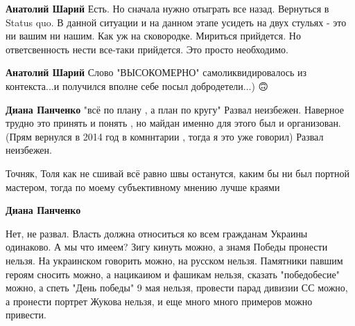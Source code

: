 \begin{itemize}
\begin{itemize}
\textbf{Анатолий Шарий} Есть. Но сначала нужно отыграть все назад. Вернуться в Status quo. В данной ситуации и на данном этапе усидеть на двух стульях - это ни вашим ни нашим. Как уж на сковородке. Мириться прийдется. Но ответсвенность нести все-таки прийдется. Это просто необходимо.

 
\textbf{Анатолий Шарий} Слово "ВЫСОКОМЕРНО" самоликвидировалось из контекста...\Laughey[1.0][white] и получился вполне себе посыл добродетели...) 🙃

 
\textbf{Диана Панченко}
"всё по плану , а план по кругу"
Развал неизбежен.
Наверное трудно это принять и понять , но майдан именно для этого был и организован.
(Прям вернулся в 2014 год в комннтарии , тогда я это уже говорил)
Развал неизбежен.

 
Точняк, Толя как не сшивай всё равно швы останутся, каким бы ни был портной
мастером, тогда по моему субъективному мнению лучше краями

 
\textbf{Диана Панченко} 

Нет, не развал. Власть должна относиться ко всем гражданам Украины одинаково. А
мы что имеем? Зигу кинуть можно, а знамя Победы пронести нельзя. На украинском
говорить можно, на русском нельзя. Памятники павшим героям сносить можно, а
нацикаиюм и фашикам нельзя, сказать "победобесие" можно, а спеть "День победы"
9 мая нельзя, провести парад дивизии СС можно, а пронести портрет Жукова
нельзя, и еще много много примеров можно привести.


\end{itemize}
\end{itemize}

